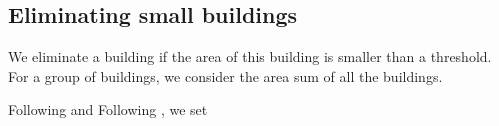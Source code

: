 \subsection{Eliminating small buildings}
\label{sec:Eliminate}
We eliminate a building if the area of this building is smaller than a 
threshold.
For a group of buildings, we consider the area sum of all the buildings.

Following \citet{Stoter2009} and Following \citet{Chaudhry2008}, 
we set 

%
%
%
%
%
%
%
%
%
%







